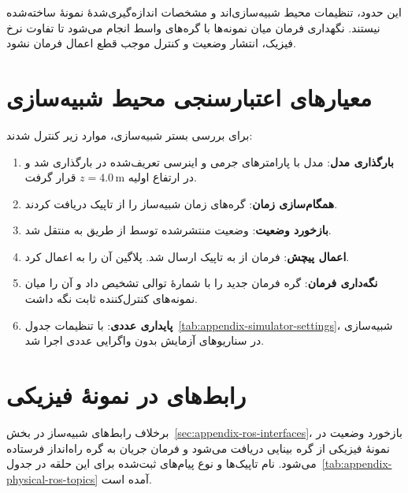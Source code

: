 این حدود، تنظیمات محیط شبیه‌سازی‌اند و مشخصات اندازه‌گیری‌شدهٔ نمونهٔ ساخته‌شده نیستند. نگهداری فرمان میان نمونه‌ها با گره‌های واسط انجام می‌شود تا تفاوت نرخ فیزیک، انتشار وضعیت و کنترل موجب قطع اعمال فرمان نشود.

\section{معیارهای اعتبارسنجی محیط شبیه‌سازی}
\label{sec:appendix-simulation-validation}

برای بررسی بستر شبیه‌سازی، موارد زیر کنترل شدند:
\begin{enumerate}
	\item \textbf{بارگذاری مدل}: مدل  با پارامترهای جرمی و اینرسی تعریف‌شده در  بارگذاری شد و در ارتفاع اولیه $z=4.0\,\mathrm m$ قرار گرفت.
	\item \textbf{همگام‌سازی زمان}: گره‌های  زمان شبیه‌ساز را از تاپیک  دریافت کردند.
	\item \textbf{بازخورد وضعیت}: وضعیت منتشرشده توسط  از طریق  به  منتقل شد.
	\item \textbf{اعمال پیچش}: فرمان  از  به تاپیک  ارسال شد. پلاگین  آن را به  اعمال کرد.
	\item \textbf{نگه‌داری فرمان}: گره  فرمان جدید را با شمارهٔ توالی  تشخیص داد و آن را میان نمونه‌های کنترل‌کننده ثابت نگه داشت.
	\item \textbf{پایداری عددی}: با تنظیمات جدول~\ref{tab:appendix-simulator-settings}، شبیه‌سازی در سناریوهای آزمایش بدون واگرایی عددی اجرا شد.
\end{enumerate}

\section{رابط‌های  در نمونهٔ فیزیکی}
\label{sec:appendix-physical-ros-interfaces}

برخلاف رابط‌های شبیه‌ساز در بخش~\ref{sec:appendix-ros-interfaces}، بازخورد وضعیت در نمونهٔ فیزیکی از گره بینایی دریافت می‌شود و فرمان جریان به گره راه‌انداز فرستاده می‌شود. نام تاپیک‌ها و نوع پیام‌های ثبت‌شده برای این حلقه در جدول~\ref{tab:appendix-physical-ros-topics} آمده است.


